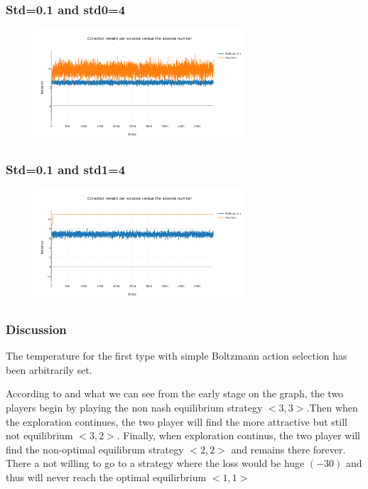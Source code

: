 \documentclass[11pt]{article}
\begin{document}
\subsubsection{Std=0.1 and std0=4}

\begin{figure}[H]
   \centering
   \includegraphics[width=0.7\textwidth]{img/2/2.png}
\end{figure}

\subsubsection{Std=0.1 and std1=4}

\begin{figure}[H]
   \centering
   \includegraphics[width=0.7\textwidth]{img/2/3.png}
\end{figure}

\subsubsection{Discussion}

The temperature for the first type with simple Boltzmann action selection has been arbitrarily set.

According to \cite{bestref} and what we can see from the early stage on the graph, the two players begin by playing the non nash equilibrium strategy $<3,3>$.Then when the exploration continues, the two player will find the more attractive but still not equilibrium $<3,2>$. Finally, when exploration continus, the two player will find the non-optimal equilibrum strategy $<2,2>$ and remains there forever. There a not willing to go to a strategy where the loss would be huge $(-30)$ and thus will never reach the optimal equilirbrium $<1,1>$
\end{document}
